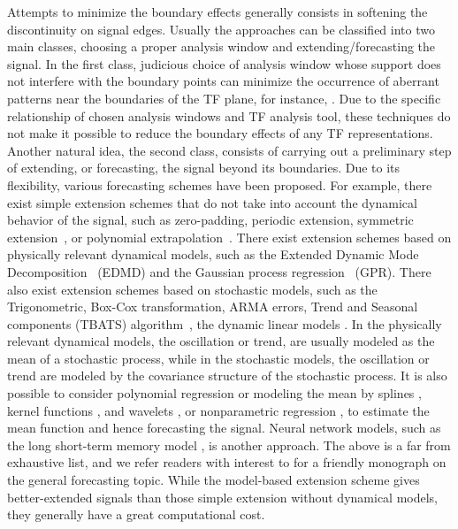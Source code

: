 \documentclass[journal]{IEEEtran}
\begin{document}
Attempts to minimize the boundary effects generally consists in softening the discontinuity on signal edges. Usually the approaches can be classified into two main classes, choosing a proper analysis window and extending/forecasting the signal. In the first class, judicious choice of analysis window whose support does not interfere with the boundary points can minimize the occurrence of aberrant patterns near the boundaries of the TF plane, for instance, \cite{Chui92wavelets,Depczynski99fast}. Due to the specific relationship of chosen analysis windows and TF analysis tool, these techniques do not make it possible to reduce the boundary effects of any TF representations. 
%
Another natural idea, the second class, consists of carrying out a preliminary step of extending, or forecasting, the signal beyond its boundaries. Due to its flexibility, various forecasting schemes have been proposed. For example, there exist simple extension schemes that do not take into account the dynamical behavior of the signal, such as zero-padding, periodic extension, symmetric extension~\cite{Kharitonenko02wavelet,Chen95symmetric}, or polynomial extrapolation~\cite{Williams97discrete}. 
%
There exist extension schemes based on physically relevant dynamical models, such as the Extended Dynamic Mode Decomposition~\cite{Williams15data} (EDMD) and the Gaussian process regression~\cite{Rasmussen06gaussian,Roberts13Gaussian} (GPR). There also exist extension schemes based on stochastic models, such as the Trigonometric, Box-Cox transformation, ARMA errors, Trend and Seasonal components (TBATS) algorithm~\cite{DeLivera11forecasting}, the dynamic linear models \cite{west2006bayesian}. 
%
In the physically relevant dynamical models, the oscillation or trend, are usually modeled as the mean of a stochastic process, while in the stochastic models, the oscillation or trend are modeled by the covariance structure of the stochastic process. 
It is also possible to consider polynomial regression \cite{fan1996local} or modeling the mean by splines \cite{hall2005theory}, kernel functions \cite{chang2010training}, and wavelets \cite{marron1998exact}, or nonparametric regression \cite{fan1996local}, to estimate the mean function and hence forecasting the signal. Neural network models, such as the long short-term memory model \cite{vlachas2018data}, is another approach. 
%
The above is a far from exhaustive list, and we refer readers with interest to \cite{hyndman2018forecasting} for a friendly monograph on the general forecasting topic. 
%
While the model-based extension scheme gives better-extended signals than those simple extension without dynamical models, they generally have a great computational cost. 
\end{document}
